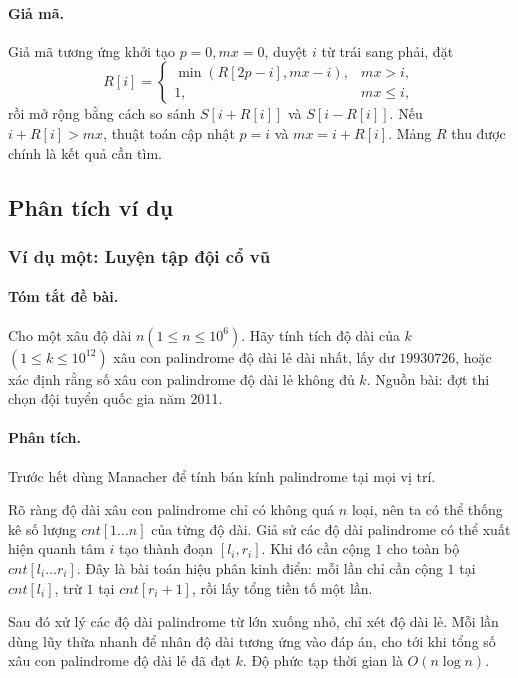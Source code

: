 \documentclass[11pt]{article}
\begin{document}
\paragraph{Giả mã.}
Giả mã tương ứng khởi tạo \(p=0,mx=0\), duyệt \(i\) từ trái sang phải, đặt
\[
  R[i]=
  \begin{cases}
    \min(R[2p-i],mx-i), & mx>i,\\
    1, & mx\le i,
  \end{cases}
\]
rồi mở rộng bằng cách so sánh \(S[i+R[i]]\) và \(S[i-R[i]]\). Nếu
\(i+R[i]>mx\), thuật toán cập nhật \(p=i\) và \(mx=i+R[i]\). Mảng \(R\) thu
được chính là kết quả cần tìm.

\subsection{Phân tích ví dụ}

\subsubsection{Ví dụ một: Luyện tập đội cổ vũ}

\paragraph{Tóm tắt đề bài.}
Cho một xâu độ dài \(n(1\le n\le10^6)\). Hãy tính tích độ dài của \(k\)
\((1\le k\le10^{12})\) xâu con palindrome độ dài lẻ dài nhất, lấy dư
\(19930726\), hoặc xác định rằng số xâu con palindrome độ dài lẻ không đủ
\(k\). Nguồn bài: đợt thi chọn đội tuyển quốc gia năm 2011.

\paragraph{Phân tích.}
Trước hết dùng Manacher để tính bán kính palindrome tại mọi vị trí.

Rõ ràng độ dài xâu con palindrome chỉ có không quá \(n\) loại, nên ta có thể
thống kê số lượng \(cnt[1\ldots n]\) của từng độ dài. Giả sử các độ dài
palindrome có thể xuất hiện quanh tâm \(i\) tạo thành đoạn \([l_i,r_i]\). Khi
đó cần cộng \(1\) cho toàn bộ \(cnt[l_i\ldots r_i]\). Đây là bài toán hiệu phân
kinh điển: mỗi lần chỉ cần cộng \(1\) tại \(cnt[l_i]\), trừ \(1\) tại
\(cnt[r_i+1]\), rồi lấy tổng tiền tố một lần.

Sau đó xử lý các độ dài palindrome từ lớn xuống nhỏ, chỉ xét độ dài lẻ. Mỗi lần
dùng lũy thừa nhanh để nhân độ dài tương ứng vào đáp án, cho tới khi tổng số
xâu con palindrome độ dài lẻ đã đạt \(k\). Độ phức tạp thời gian là
\(O(n\log n)\).
\end{document}
